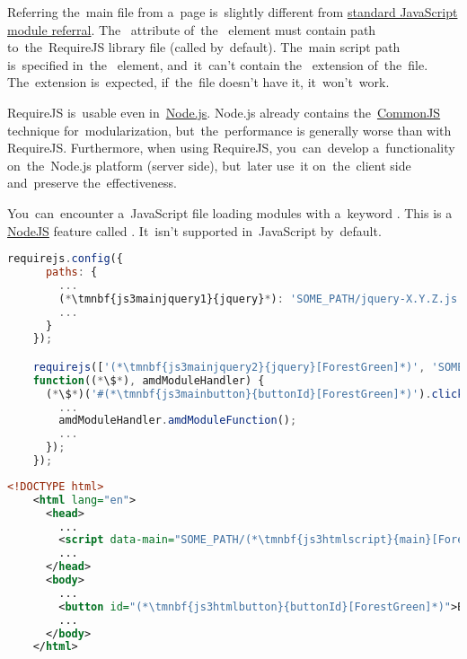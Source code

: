 Referring the~main file from a~page is~slightly different from \hyperref[javascriptmodularity]{standard JavaScript module referral}.
The~ attribute of~the~ element must contain path to~the~RequireJS library file (called  by~default).
The~main script path is~specified in~the~ element, and~it~can't contain the~ extension of~the~file.
The~extension is~expected, if~the~file doesn't have it, it~won't~work.

\note RequireJS is~usable even in~\hyperref[nodejs]{Node.js}.
Node.js already contains \mbox{the \hyperref[commonjs]{CommonJS}} technique for~modularization, but~the~performance is generally worse than with RequireJS\@.
Furthermore, when using RequireJS, you~can~develop a~functionality on~the~Node.js platform (server side), but~later use~it on~the~client side and~preserve the~effectiveness.

\warning You~can~encounter a~JavaScript file loading modules with a~keyword .
This is a \hyperref[nodejs]{NodeJS} feature called \hyperref[commonjs]{}.
It~isn't supported in~JavaScript by~default.
\newpage

\begin{lstlisting}[language=JavaScript,title={Main JavaScript file \textit{\tmnbf{js3mainscript}{main}.js}}]
    requirejs.config({
      paths: {
        ...
        (*\tmnbf{js3mainjquery1}{jquery}*): 'SOME_PATH/jquery-X.Y.Z.js'
        ...
      }
    });

    requirejs(['(*\tmnbf{js3mainjquery2}{jquery}[ForestGreen]*)', 'SOME_PATH/amd_module'],
    function((*\$*), amdModuleHandler) {
      (*\$*)('#(*\tmnbf{js3mainbutton}{buttonId}[ForestGreen]*)').click(function() {
        ...
        amdModuleHandler.amdModuleFunction();
        ...
      });
    });
\end{lstlisting}
\begin{lstlisting}[language=XML,title={Web page file loading the JavaScript file}]
    <!DOCTYPE html>
    <html lang="en">
      <head>
        ...
        <script data-main="SOME_PATH/(*\tmnbf{js3htmlscript}{main}[ForestGreen]*)" src="SOME_OTHER_PATH/require.js"></script>
        ...
      </head>
      <body>
        ...
        <button id="(*\tmnbf{js3htmlbutton}{buttonId}[ForestGreen]*)">BUTTON_LABEL</button>
        ...
      </body>
    </html>
\end{lstlisting}
\newpage


